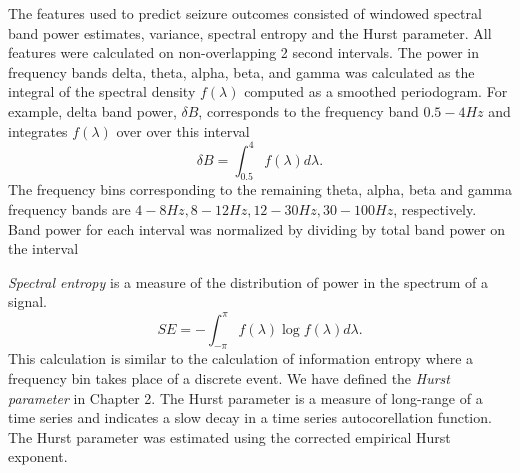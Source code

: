 The features used to predict seizure outcomes 
 consisted of windowed spectral band power
estimates, variance, spectral entropy and the Hurst parameter.
All features were calculated on non-overlapping 2 second intervals. 
The power in frequency bands 
delta, theta, alpha, beta, and gamma was calculated 
as the integral of the spectral density $f(\lambda)$ 
computed as a smoothed periodogram. For example, 
delta band power, $\delta B$, corresponds to 
the frequency band $0.5-4Hz$ and integrates  
$f(\lambda)$ over over this interval
\[
  \delta B = \int_{0.5}^{4} f(\lambda) d\lambda. 
\]
The frequency bins corresponding to the remaining
theta, alpha, beta and gamma frequency bands are 
$ 4-8Hz, 8-12Hz, 12-30Hz, 30-100Hz$, respectively.
Band power for each interval was 
normalized by dividing by total band power on the interval



 \textit{Spectral entropy} is a measure of the distribution of 
 power in the spectrum of a signal. 
\[  
  SE = - \int_{-\pi}^{\pi} f(\lambda) \log f(\lambda) d \lambda.
\]
This calculation is similar to the calculation of information 
entropy where a frequency bin takes place of a discrete event.
We have defined the \textit{Hurst parameter} in Chapter 2. The Hurst 
parameter is a measure of long-range of a time series and indicates 
a slow decay in a time series autocorellation function. The Hurst parameter was estimated using the corrected empirical Hurst exponent\cite{weron2002}.  

